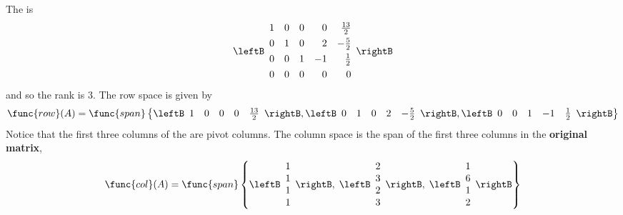 \begin{solution}
The \rref \;is 
\begin{equation*}
\leftB 
\begin{array}{rrrrrr}
1 & 0 & 0 & 0 & \vspace{0.05in}\frac{13}{2} \\ 
0 & 1 & 0 & 2 & -\vspace{0.05in}\frac{5}{2} \\ 
0 & 0 & 1 & -1 & \vspace{0.05in}\frac{1}{2} \\ 
0 & 0 & 0 & 0 & 0
\end{array}
\rightB 
\end{equation*}
and so the rank is $3$. The row space is given by 
\begin{equation*}
\func{row}(A) = \func{span} \left\{ 
\leftB 
\begin{array}{ccccc}
1 & 0 & 0 & 0 & \frac{13}{2}
\end{array}
\rightB,
\leftB 
\begin{array}{rrrrr}
0 & 1 & 0 & 2 & -\frac{5}{2}
\end{array}
\rightB , 
\leftB 
\begin{array}{rrrrr}
0 & 0 & 1 & -1 & \frac{1}{2}
\end{array}
\rightB
 \right\}
\end{equation*}
Notice that the first three columns of the \rref \;are pivot columns. The column space is the span of the first three columns in the \textbf{original matrix}, 
\begin{equation*}
\func{col}(A) = \func{span} \left\{ \leftB 
\begin{array}{r}
1 \\ 
1 \\ 
1 \\ 
1
\end{array}
\rightB, \; \leftB 
\begin{array}{r}
2 \\ 
3 \\ 
2 \\ 
3
\end{array}
\rightB , \; \leftB 
\begin{array}{r}
1 \\ 
6 \\ 
1 \\ 
2
\end{array}
\rightB \right\}
\end{equation*}

\end{solution}

